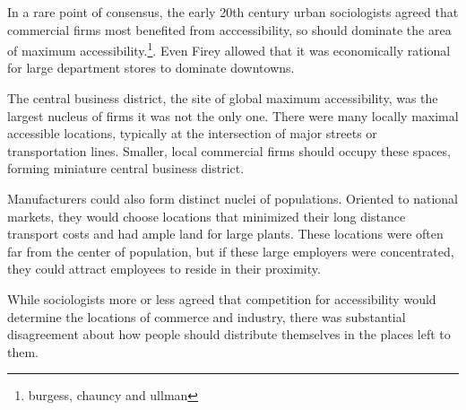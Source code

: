 In a rare point of consensus, the early 20th century urban
sociologists agreed that commercial firms most benefited from
acccessibility, so should dominate the area of maximum
accessibility.\footnote{burgess, chauncy and ullman}. Even Firey
allowed that it was economically rational for large department stores
to dominate downtowns.

The central business district, the site of global maximum
accessibility, was the largest nucleus of firms it was not the only
one. There were many locally maximal accessible locations, typically
at the intersection of major streets or transportation lines. Smaller,
local commercial firms should occupy these spaces, forming miniature
central business district.

Manufacturers could also form distinct nuclei of populations. Oriented
to national markets, they would choose locations that minimized their
long distance transport costs and had ample land for large
plants. These locations were often far from the center of population,
but if these large employers were concentrated, they could attract
employees to reside in their proximity.

While sociologists more or less agreed that competition for
accessibility would determine the locations of commerce and industry,
there was substantial disagreement about how people should distribute
themselves in the places left to them.







